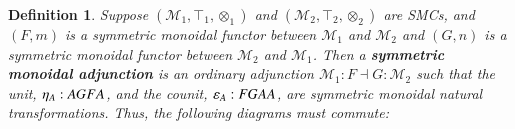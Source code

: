 \documentclass{article}
\newtheorem{definition}[theorem]{Definition}
\let\to\relax
\newcommand{\to}{\rightarrow}
\newcommand{\cat}[1]{\mathcal{#1}}
\newcommand{\p}[1]{\mathsf{p}_{#1}}
\newcommand{\q}[1]{\mathsf{q}_{#1}}
\begin{document}
\begin{definition}
  \label{def:SMCADJ}
  Suppose $(\cat{M}_1,\top_1,\otimes_1)$ and $(\cat{M}_2,\top_2,\otimes_2)$
  are SMCs, and $(F,m)$ is a symmetric monoidal functor between
  $\cat{M}_1$ and $\cat{M}_2$ and $(G,n)$ is a symmetric monoidal
  functor between $\cat{M}_2$ and $\cat{M}_1$.  Then a
  \textbf{symmetric monoidal adjunction} is an ordinary adjunction
  $\cat{M}_1 : F \dashv G : \cat{M}_2$ such that the unit,
  $\eta_A : A \to GFA$, and the counit, $\varepsilon_A : FGA \to A$, are
  symmetric monoidal natural transformations.  Thus, the following
  diagrams must commute:
\end{definition}
\end{document}
